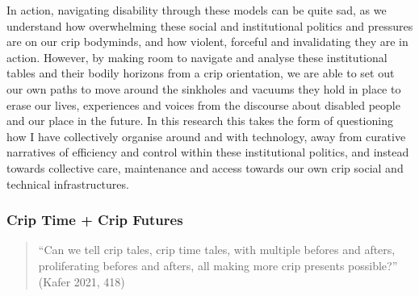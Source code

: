 In action, navigating disability through these models can be quite sad,
as we understand how overwhelming these social and institutional
politics and pressures are on our crip bodyminds, and how violent,
forceful and invalidating they are in action. However, by making room to
navigate and analyse these institutional tables and their bodily
horizons from a crip orientation, we are able to set out our own paths
to move around the sinkholes and vacuums they hold in place to erase our
lives, experiences and voices from the discourse about disabled people
and our place in the future. In this research this takes the form of
questioning how I have collectively organise around and with technology,
away from curative narratives of efficiency and control within these
institutional politics, and instead towards collective care, maintenance
and access towards our own crip social and technical infrastructures.

\hypertarget{crip-time-crip-futures}{%
\subsubsection{Crip Time + Crip Futures}\label{crip-time-crip-futures}}

\begin{quote}
``Can we tell crip tales, crip time tales, with multiple befores and
afters, proliferating befores and afters, all making more crip presents
possible?'' (Kafer 2021, 418)
\end{quote}

